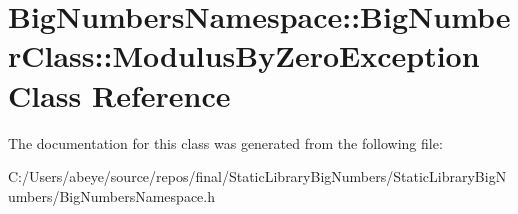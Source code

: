 \hypertarget{class_big_numbers_namespace_1_1_big_number_class_1_1_modulus_by_zero_exception}{}\section{Big\+Numbers\+Namespace\+:\+:Big\+Number\+Class\+:\+:Modulus\+By\+Zero\+Exception Class Reference}
\label{class_big_numbers_namespace_1_1_big_number_class_1_1_modulus_by_zero_exception}


The documentation for this class was generated from the following file\+:\begin{DoxyCompactItemize}
\item 
C\+:/\+Users/abeye/source/repos/final/\+Static\+Library\+Big\+Numbers/\+Static\+Library\+Big\+Numbers/Big\+Numbers\+Namespace.\+h\end{DoxyCompactItemize}
